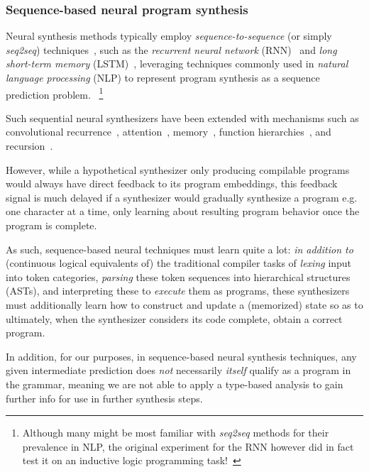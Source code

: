 \documentclass{article}
\begin{document}
\subsubsection{Sequence-based neural program synthesis} %

Neural synthesis methods typically employ \emph{sequence-to-sequence}
(or simply \emph{seq2seq}) techniques~\citep{npi,neuralmachinetranslation,alphanpi},
such as the \emph{recurrent neural network} (RNN)~\citep{backproprnn}
and \emph{long short-term memory} (LSTM)~\citep{lstm},
leveraging techniques commonly used in \emph{natural language processing} (NLP)
to represent program synthesis as a sequence prediction problem.%
~\footnote{
    Although many might be most familiar with \emph{seq2seq} methods for their prevalence in NLP,
    the original experiment for the RNN however did in fact test it
    on an inductive logic programming task!~\citep{backproprnn}
}

Such sequential neural synthesizers have been extended with mechanisms such as
convolutional recurrence~\citep{neuralgpu},
attention~\citep{nmt,ptrnets,structuredattention},
memory~\citep{ntm,neuralram,neuralprogrammer,hierarchicalmemory},
function hierarchies~\citep{npi,npl},
and recursion~\citep{cai2017making}.

However, while a hypothetical synthesizer only producing compilable programs would always have direct feedback to its program embeddings,
this feedback signal is much delayed if a synthesizer would gradually synthesize a program e.g. one character at a time,
only learning about resulting program behavior once the program is complete.

As such, sequence-based neural techniques must learn quite a lot:
\emph{in addition to} (continuous logical equivalents of) the traditional compiler tasks of \emph{lexing} input into token categories,
\emph{parsing} these token sequences into hierarchical structures (ASTs),
and interpreting these to \emph{execute} them as programs,
these synthesizers must additionally learn how to construct and update a (memorized) state so as to ultimately,
when the synthesizer considers its code complete, obtain a correct program.

In addition, for our purposes, in sequence-based neural synthesis techniques,
any given intermediate prediction does \emph{not} necessarily \emph{itself} qualify as a program in the grammar,
meaning we are not able to apply a type-based analysis to gain further info for use in further synthesis steps.
\end{document}
